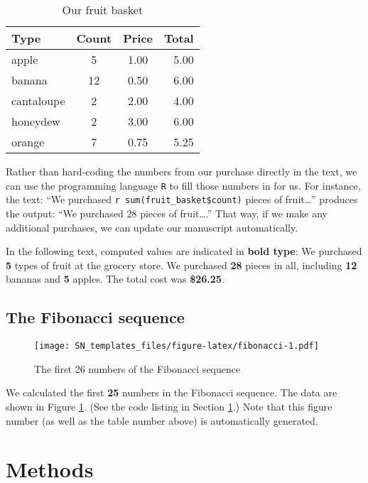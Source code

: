 \documentclass[smallextended]{svjour3}       %
\begin{document}
\begin{table}

\caption{\label{tab:fruit-basket}Our fruit basket}
\centering
\begin{tabular}[t]{lccr}
\toprule
Type & Count & Price & Total\\
\midrule
apple & 5 & 1.00 & 5.00\\
banana & 12 & 0.50 & 6.00\\
cantaloupe & 2 & 2.00 & 4.00\\
honeydew & 2 & 3.00 & 6.00\\
orange & 7 & 0.75 & 5.25\\
\bottomrule
\end{tabular}
\end{table}

Rather than hard-coding the numbers from our purchase directly in the text, we can use the programming language \texttt{R} to fill those numbers in for us. For instance, the text: ``We purchased \texttt{\textasciigrave{}r\ sum(fruit\_basket\$count)\textasciigrave{}} pieces of fruit\ldots{}'' produces the output: ``We purchased 28 pieces of fruit\ldots{}.'' That way, if we make any additional purchases, we can update our manuscript automatically.

In the following text, computed values are indicated in \textbf{bold type}: We purchased \textbf{5} types of fruit at the grocery store. We purchased \textbf{28} pieces in all, including \textbf{12} bananas and \textbf{5} apples. The total cost was \textbf{\$26.25}.

\hypertarget{sec:2}{%
\subsection{The Fibonacci sequence}\label{sec:2}}

\begin{figure}
\centering
\texttt{[image: SN\_templates\_files/figure-latex/fibonacci-1.pdf]}
\caption{\label{fig:fibonacci}The first 26 numbers of the Fibonacci sequence}
\end{figure}

We calculated the first \textbf{25} numbers in the Fibonacci sequence. The data are shown in Figure \ref{fig:fibonacci}. (See the code listing in Section \ref{methods}.) Note that this figure number (as well as the table number above) is automatically generated.

\hypertarget{methods}{%
\section{Methods}\label{methods}}
\end{document}
